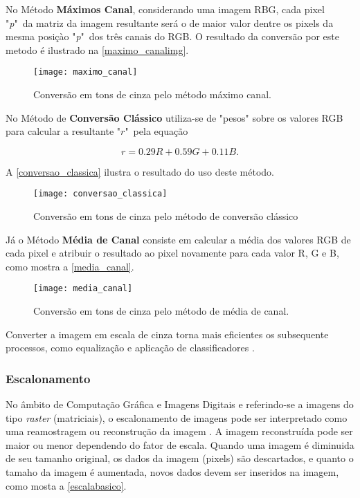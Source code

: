 No Método \textbf{Máximos Canal}, considerando uma imagem RBG, cada pixel "\textit{p}"\ da matriz da imagem resultante será o de maior valor dentre os pixels da mesma posiçào "\textit{p}"\ dos três canais do RGB. O resultado da conversão por este metodo é ilustrado na \autoref{maximo_canalimg}.
\begin{figure}[h]
	\centering
	\texttt{[image: maximo\_canal]}
	\caption{Conversão em tons de cinza pelo método máximo canal.}
	\label{maximo_canalimg}
\end{figure}	

	
No Método de \textbf{Conversão Clássico} utiliza-se de "pesos" sobre os valores RGB para calcular a resultante "$r$"\ pela equação

 \begin{equation}
	 r = 0.29R + 0.59G + 0.11B. 
 \end{equation}

 
 A \autoref{conversao_classica} ilustra o resultado do uso deste método. 
\begin{figure}[h]
	\centering
	\texttt{[image: conversao\_classica]}
	\caption{Conversão em tons de cinza pelo método de conversão clássico}
	\label{conversao_classica}
\end{figure}

Já o Método \textbf{Média de Canal} consiste em calcular a média dos valores RGB de cada pixel e atribuir o resultado ao pixel novamente para cada valor R, G e B, como mostra a \autoref{media_canal}.
\begin{figure}[h]
	\centering
	\texttt{[image: media\_canal]}
	\caption{Conversão em tons de cinza pelo método de média de canal.}
	\label{media_canal}
\end{figure}

Converter a imagem em escala de cinza torna mais eficientes os subsequente processos, como equalização e aplicação de classificadores \cite{drmathew_java_programming}. 




\subsubsection{Escalonamento}\label{subsubsec:escalonamento}

No âmbito de Computação Gráfica e Imagens Digitais e referindo-se a imagens do tipo \textit{raster} (matriciais), o escalonamento de imagens pode ser interpretado como uma reamostragem ou reconstrução da imagem \cite{tech_algo_scaling}. A imagem reconstruída pode ser maior ou menor dependendo do fator de escala. Quando uma imagem é diminuida de seu tamanho original, os dados da imagem (pixels) são descartados, e quanto o tamaho da imagem é aumentada, novos dados devem ser inseridos na imagem, como mosta a \autoref{escalabasico}. 


